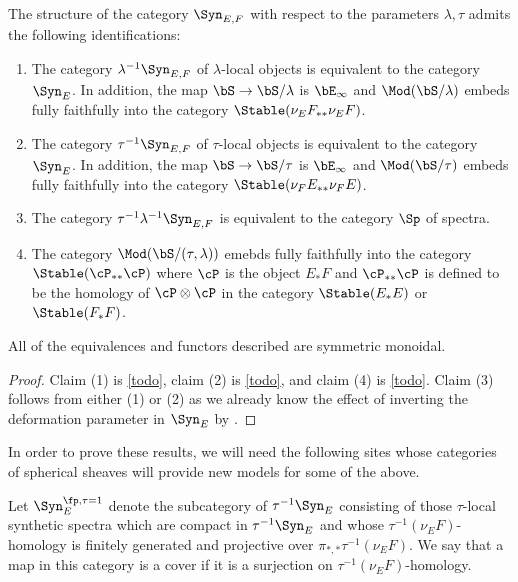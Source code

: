 



\begin{theorem}
    The structure of the category $\Syn_{E,F}$ with respect to the parameters $\lambda, \tau$ admits the following identifications:
  
    \begin{enumerate}
      \item The category $\lambda^{-1}\Syn_{E,F}$ of $\lambda$-local objects is equivalent to the category $\Syn_E$. In addition, the map $\bS\to \bS/\lambda$ is $\bE_\infty$ and $\Mod(\bS/\lambda)$ embeds fully faithfully into the category $\Stable(\nu_E F_{**}\nu_E F)$.
      \item The category $\tau^{-1}\Syn_{E,F}$ of $\tau$-local objects is equivalent to the category $\Syn_E$. In addition, the map $\bS\to \bS/\tau$ is $\bE_\infty$ and $\Mod(\bS/\tau)$ embeds fully faithfully into the category $\Stable(\nu_F E_{**}\nu_F E)$.
      \item The category $\tau^{-1}\lambda^{-1}\Syn_{E,F}$ is equivalent to the category $\Sp$ of spectra.
      \item The category $\Mod(\bS/(\tau,\lambda))$ emebds fully faithfully into the category $\Stable(\cP_{**}\cP)$ where $\cP$ is the object $E_*F$ and $\cP_{**}\cP$ is defined to be the homology of $\cP\otimes \cP$ in the category $\Stable(E_*E)$ or $\Stable(F_*F)$.
    \end{enumerate}
    All of the equivalences and functors described are symmetric monoidal.
    
  \end{theorem}
  
  \begin{proof}
    Claim (1) is \ref{todo}, claim (2) is \ref{todo}, and claim (4) is \ref{todo}. Claim (3) follows from either (1) or (2) as we already know the effect of inverting the deformation parameter in $\Syn_E$ by \cite{todo}.
  \end{proof}
  
  In order to prove these results, we will need the following sites whose categories of spherical sheaves will provide new models for some of the above.
  
  \begin{definition}
    Let $\Syn_E^{\fp, \tau=1}$ denote the subcategory of $\tau^{-1}\Syn_E$ consisting of those $\tau$-local synthetic spectra which are compact in $\tau^{-1}\Syn_E$ and whose $\tau^{-1}(\nu_E F)$-homology is finitely generated and projective over $\pi_{*,*}\tau^{-1}(\nu_E F)$. We say that a map in this category is a cover if it is a surjection on $\tau^{-1}(\nu_E F)$-homology.
  \end{definition}
  
